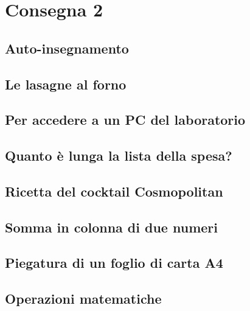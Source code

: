 \chapter{Consegna 2}

\section{Auto-insegnamento}

\section{Le lasagne al forno}

\section{Per accedere a un PC del laboratorio}

\section{Quanto è lunga la lista della spesa?}

\section{Ricetta del cocktail Cosmopolitan}

\section{Somma in colonna di due numeri}

\section{Piegatura di un foglio di carta A4}

\section{Operazioni matematiche}